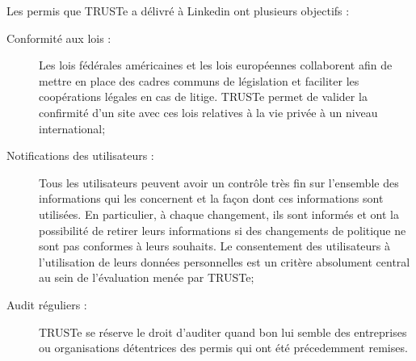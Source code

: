 Les permis que TRUSTe a délivré à Linkedin ont plusieurs objectifs :

\begin{description}

\item[Conformité aux lois :] Les lois fédérales américaines et les lois
européennes collaborent afin de mettre en place des cadres communs de
législation et faciliter les coopérations légales en cas de litige. TRUSTe
permet de valider la confirmité d'un site avec ces lois relatives à la vie
privée à un niveau international;

\item[Notifications des utilisateurs :] Tous les utilisateurs peuvent avoir un
contrôle très fin sur l'ensemble des informations qui les concernent et la
façon dont ces informations sont utilisées. En particulier, à chaque changement,
ils sont informés et ont la possibilité de retirer leurs informations si des
changements de politique ne sont pas conformes à leurs souhaits. Le
consentement des utilisateurs à l'utilisation de leurs données personnelles est
un critère absolument central au sein de l'évaluation menée par TRUSTe;

\item[Audit réguliers :] TRUSTe se réserve le droit d'auditer quand bon lui
semble des entreprises ou organisations détentrices des permis qui ont été
précedemment remises.

\end{description}
